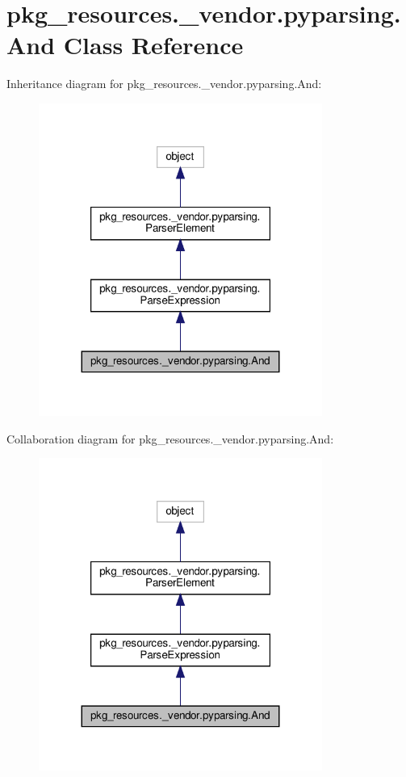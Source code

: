 \hypertarget{classpkg__resources_1_1__vendor_1_1pyparsing_1_1And}{}\section{pkg\+\_\+resources.\+\_\+vendor.\+pyparsing.\+And Class Reference}
\label{classpkg__resources_1_1__vendor_1_1pyparsing_1_1And}


Inheritance diagram for pkg\+\_\+resources.\+\_\+vendor.\+pyparsing.\+And\+:
\nopagebreak
\begin{figure}[H]
\begin{center}
\leavevmode
\includegraphics[width=263pt]{classpkg__resources_1_1__vendor_1_1pyparsing_1_1And__inherit__graph}
\end{center}
\end{figure}


Collaboration diagram for pkg\+\_\+resources.\+\_\+vendor.\+pyparsing.\+And\+:
\nopagebreak
\begin{figure}[H]
\begin{center}
\leavevmode
\includegraphics[width=263pt]{classpkg__resources_1_1__vendor_1_1pyparsing_1_1And__coll__graph}
\end{center}
\end{figure}
